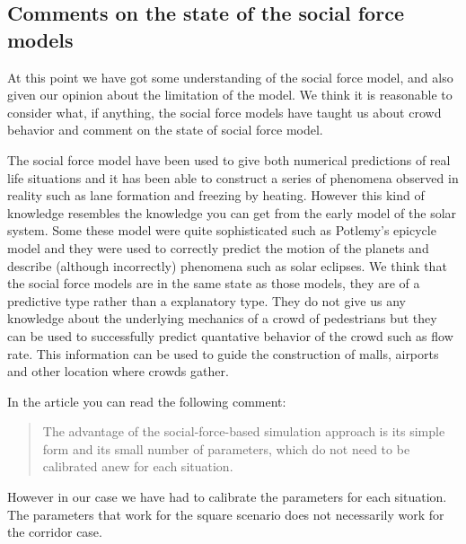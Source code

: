 \subsection{Comments on the state of the social force models}
At this point we have got some understanding of the social force model, and 
also given our opinion about the limitation of the model. We think it is 
reasonable to consider what, if anything, the social force models have taught 
us about crowd behavior and comment on the state of social force model. 

The social force model have been used to give both numerical predictions of 
real life situations and it has been able to construct a series of phenomena 
observed in reality such as lane formation and freezing by heating.
However this kind of knowledge resembles the knowledge you can get from 
the early model of the solar system. Some these model were quite sophisticated 
such as Potlemy's epicycle model and they were used to correctly predict the 
motion of the planets and describe (although incorrectly) phenomena such as 
solar eclipses.
We think that the social force models are in the same state as those models, 
they are of a predictive type rather than a explanatory type. They do not give 
us any knowledge about the underlying mechanics of a crowd of pedestrians but 
they can be used to successfully predict quantative behavior of the crowd such 
as flow rate. This information can be used to guide the construction of malls, 
airports and other location where crowds gather.

In the article \cite{self-org} you can read the following comment:

\begin{quote}
	The advantage of the social-force-based simulation
	approach is its simple form and its small number of
	parameters, which do not need to be calibrated anew
	for each situation.
\end{quote}

However in our case we have had to calibrate the parameters for each 
situation. The parameters that work for the square scenario does not 
necessarily work for the corridor case.  
